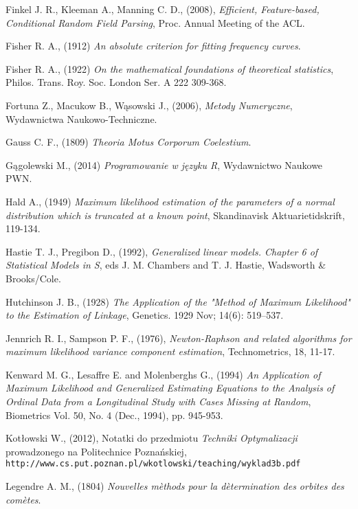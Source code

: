 \begin{thebibliography}{99}
  Finkel J. R., Kleeman A., Manning C. D., (2008), \textit{Efficient, Feature-based, Conditional Random Field Parsing}, Proc. Annual Meeting of the ACL.

 Fisher R. A., (1912) \textit{An absolute criterion for fitting frequency curves}. 

 Fisher R. A., (1922) \textit{On the mathematical foundations of theoretical statistics}, Philos. Trans. Roy. Soc. London Ser. A 222 309-368.

 Fortuna Z., Macukow B., Wąsowski J., (2006), \textit{Metody Numeryczne}, Wydawnictwa Naukowo-Techniczne.

 Gauss C. F., (1809) \textit{Theoria Motus Corporum Coelestium}.

 Gągolewski M., (2014) \textit{Programowanie w języku R}, Wydawnictwo Naukowe PWN.


 Hald A., (1949) \textit{Maximum likelihood estimation of the parameters of a normal distribution which is truncated at a known point}, Skandinavisk Aktuarietidskrift, 119-134.


 Hastie T. J., Pregibon D., (1992), \textit{Generalized linear models. Chapter 6 of Statistical Models in S}, eds J. M. Chambers and T. J. Hastie, Wadsworth \& Brooks/Cole.


 Hutchinson J. B., (1928) \textit{The Application of the "Method of Maximum Likelihood" to the Estimation of Linkage}, Genetics. 1929 Nov; 14(6): 519–537.


 Jennrich R. I., Sampson P. F., (1976), \textit{Newton-Raphson and related algorithms for maximum likelihood variance component estimation}, Technometrics, 18, 11-17.


 Kenward M. G., Lesaffre E. and Molenberghs G., (1994) \textit{An Application of Maximum Likelihood and Generalized Estimating Equations to the Analysis of Ordinal Data from a Longitudinal Study with Cases Missing at Random}, Biometrics
Vol. 50, No. 4 (Dec., 1994), pp. 945-953.

 Kotłowski W., (2012), Notatki do przedmiotu \textit{Techniki Optymalizacji} prowadzonego na Politechnice Poznańskiej, \\ \texttt{http://www.cs.put.poznan.pl/wkotlowski/teaching/wyklad3b.pdf}

 Legendre A. M., (1804) \textit{Nouvelles m\`ethods pour la d\`etermination des orbites des com\`etes}.



\end{thebibliography}
